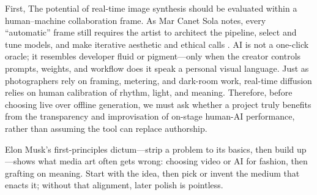 \documentclass[sigconf,nonacm]{acmart}
\begin{document}
First, The potential of real-time image synthesis should be evaluated within a human–machine collaboration frame. As Mar Canet Sola notes, every “automatic” frame still requires the artist to architect the pipeline, select and tune models, and make iterative aesthetic and ethical calls \cite{guljajeva_canet_sola_artist_2024}. AI is not a one-click oracle; it resembles developer fluid or pigment—only when the creator controls prompts, weights, and workflow does it speak a personal visual language. Just as photographers rely on framing, metering, and dark-room work, real-time diffusion relies on human calibration of rhythm, light, and meaning. Therefore, before choosing live over offline generation, we must ask whether a project truly benefits from the transparency and improvisation of on-stage human-AI performance, rather than assuming the tool can replace authorship.

Elon Musk’s first-principles dictum—strip a problem to its basics, then build up \cite{Brier2014}—shows what media art often gets wrong: choosing video or AI for fashion, then grafting on meaning. Start with the idea, then pick or invent the medium that enacts it; without that alignment, later polish is pointless.
\end{document}

